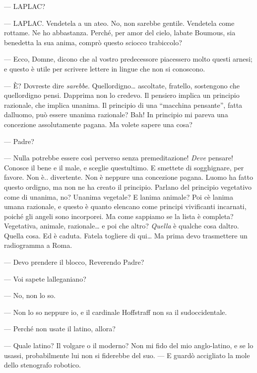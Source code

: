 	--- L\textquotesingle APLAC?
	
	--- L\textquotesingle APLAC. Vendetela a un ateo. No, non sarebbe
	gentile. Vendetela come rottame. Ne ho abbastanza. Perché, per amor del
	cielo, l\textquotesingle abate Boumous, sia benedetta la sua anima,
	comprò questo sciocco trabiccolo?
	
	--- Ecco, Domne, dicono che al vostro predecessore piacessero molto
	questi arnesi; e questo è utile per scrivere lettere in lingue che non
	si conoscono.
	
	--- È? Dovreste dire \emph{sarebbe}.
	Quell\textquotesingle ordigno\ldots{} ascoltate, fratello, sostengono
	che quell\textquotesingle ordigno pensi. Dapprima non lo credevo. Il
	pensiero implica un principio razionale, che implica
	un\textquotesingle anima. Il principio di una ``macchina pensante'',
	fatta dall\textquotesingle uomo, può essere un\textquotesingle anima
	razionale? Bah! In principio mi pareva una concezione assolutamente
	pagana. Ma volete sapere una cosa?
	
	--- Padre?
	
	--- Nulla potrebbe essere così perverso senza premeditazione!
	\emph{Deve} pensare! Conosce il bene e il male, e sceglie
	quest\textquotesingle ultimo. E smettete di sogghignare, per favore. Non
	è.. divertente. Non è neppure una concezione pagana.
	L\textquotesingle uomo ha fatto questo ordigno, ma non ne ha creato il
	principio. Parlano del principio vegetativo come di
	un\textquotesingle anima, no? Un\textquotesingle anima vegetale? E
	l\textquotesingle anima animale? Poi c\textquotesingle è
	l\textquotesingle anima umana razionale, e questo è quanto elencano come
	principi vivificanti incarnati, poiché gli angeli sono incorporei. Ma
	come sappiamo se la lista è completa? Vegetativa, animale,
	razionale\ldots{} e poi che altro? \emph{Quella} è qualche cosa
	d\textquotesingle altro. Quella cosa. Ed è caduta. Fatela togliere di
	qui\ldots{} Ma prima devo trasmettere un radiogramma a Roma.
	
	--- Devo prendere il blocco, Reverendo Padre?
	
	--- Voi sapete l\textquotesingle alleganiano?
	
	--- No, non lo so.
	
	--- Non lo so neppure io, e il cardinale Hoffstraff non sa il
	sudoccidentale.
	
	--- Perché non usate il latino, allora?
	
	--- Quale latino? Il volgare o il moderno? Non mi fido del mio
	anglo-latino, e se lo usassi, probabilmente lui non si fiderebbe del
	suo. --- E guardò accigliato la mole dello stenografo robotico.
	
